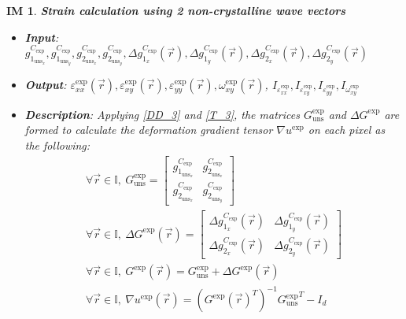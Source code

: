 \documentclass[12pt]{article}
\newtheorem{IM}{IM}
\begin{document}
\begin{IM}
\label{IM_5}
\noindent\colorbox{shadecolorIM}{\normalfont \textbf{Strain calculation using 2 non-crystalline wave vectors}}
\normalfont
\begin{itemize}
\item \textbf{Input}: $g_{1_{{\text{uns}}_x}}^{C_{\text{exp}}}, g_{1_{{\text{uns}}_y}}^{C_{\text{exp}}},g_{2_{{\text{uns}}_x}}^{C_{\text{exp}}}, g_{2_{{\text{uns}}_y}}^{C_{\text{exp}}}, \Delta g_{1_{x}}^{C_{\text{exp}}}(\vec{r}), \Delta g_{1_{y}}^{C_{\text{exp}}}(\vec{r}),\Delta g_{2_{x}}^{C_{\text{exp}}}(\vec{r}),\Delta g_{2_{y}}^{C_{\text{exp}}}(\vec{r})$
\item \textbf{Output}: $\varepsilon_{\mathit{xx}}^{\text{exp}}(\vec{r}),\varepsilon_{\mathit{xy}}^{\text{exp}}(\vec{r}),\varepsilon_{\mathit{yy}}^{\text{exp}}(\vec{r}),\omega_{\mathit{xy}}^{\text{exp}}(\vec{r})$, $I_{\varepsilon_{\mathit{xx}}^{\text{exp}}},I_{\varepsilon_{\mathit{xy}}^{\text{exp}}},I_{\varepsilon_{\mathit{yy}}^{\text{exp}}},I_{\omega_{\mathit{xy}}^{\text{exp}}}$
\item \textbf{Description}: Applying \cref{DD_3} and \cref{T_3}, the matrices $G_{\text{uns}}^{\text{exp}}$ and $\Delta G^{\text{exp}}$ are formed to calculate the deformation gradient tensor $\nabla u^{\text{exp}}$ on each pixel as the following:
\begin{equation}
\begin{gathered}
\forall \vec{r} \in \mathbb{I}, \ G_{\text{uns}}^{\text{exp}} =
	\begin{bmatrix}
	g_{1_{{\text{uns}}_x}}^{C_{\text{exp}}} & g_{2_{{\text{uns}}_x}}^{C_{\text{exp}}} \\
	g_{2_{{\text{uns}}_x}}^{C_{\text{exp}}} & g_{2_{{\text{uns}}_y}}^{C_{\text{exp}}} 
	\end{bmatrix} \\
\forall \vec{r} \in \mathbb{I}, \	\Delta G^{\text{exp}}(\vec{r})=
	\begin{bmatrix}
	\Delta g_{1_{x}}^{C_{\text{exp}}}(\vec{r}) & \Delta g_{1_{y}}^{C_{\text{exp}}}(\vec{r}) \\
	\Delta g_{2_{x}}^{C_{\text{exp}}}(\vec{r}) & \Delta g_{2_{y}}^{C_{\text{exp}}}(\vec{r})
	\end{bmatrix} \\
	\forall \vec{r} \in \mathbb{I}, \	G^{\text{exp}}(\vec{r})= G_{\text{uns}}^{\text{exp}} + \Delta G^{\text{exp}}(\vec{r})\\
\forall \vec{r} \in \mathbb{I}, \	\nabla u^{\text{exp}}(\vec{r}) = ({{G^{\text{exp}}}(\vec{r})}^{T})^{-1}{{G_{\text{uns}}^{\text{exp}}}}^{T}-I_{d}

\end{gathered}
\end{equation}
\end{itemize}
\end{IM}
\end{document}
